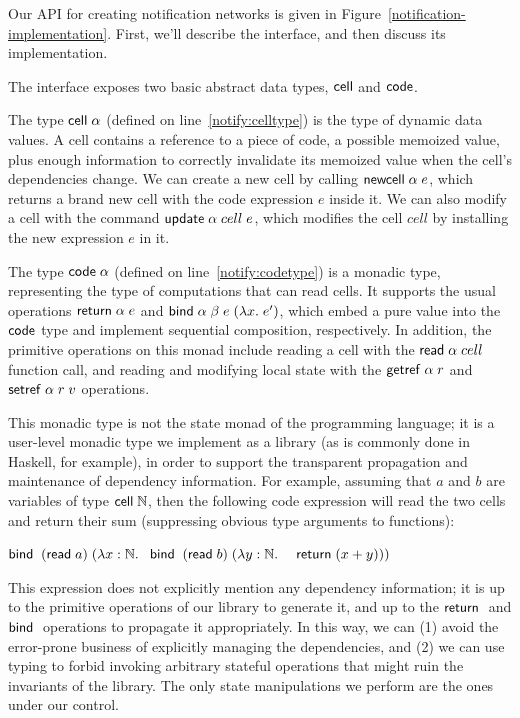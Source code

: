 \documentclass[preprint,natbib]{sigplanconf}
\begin{document}
Our API for creating notification networks is given in
Figure~\ref{notification-implementation}. First, we'll describe
the interface, and then discuss its implementation. 

The interface exposes two basic abstract data types, $\mbox{\textsf{{cell}}}$
and $\mbox{\textsf{{code}}}$.

The type $\mbox{\textsf{{cell}}}\;{\alpha}$ (defined on line~\ref{notify:celltype}) is the
type of dynamic data values. A cell contains a reference to a piece of
code, a possible memoized value, plus enough information to correctly
invalidate its memoized value when the cell's dependencies change. We
can create a new cell by calling $\mbox{\textsf{{newcell}}}\; \alpha\; e$, which returns a brand
new cell with the code expression $e$ inside it. We can also modify a
cell with the command $\mbox{\textsf{{update}}}\; \alpha\;cell\;e$, which modifies the
cell $cell$ by installing the new expression $e$ in it.

The type $\mbox{\textsf{{code}}}\;{\alpha}$ (defined on line~\ref{notify:codetype}) is a
monadic type, representing the type of computations that can read
cells. It supports the usual operations $\mbox{\textsf{{return}}}\; \alpha\;e$ and $\mbox{\textsf{{bind}}}\; \alpha\;\beta\;e\;
(\lambda x.\;e')$, which embed a pure value into the $\mbox{\textsf{{code}}}$
type and implement sequential composition, respectively. In addition,
the primitive operations on this monad include reading a cell with the
$\mbox{\textsf{{read}}}\; \alpha\;cell$ function call, and reading and modifying local state
with the $\mbox{\textsf{{getref}}}\; \alpha\;r$ and $\mbox{\textsf{{setref}}}\; \alpha\;r\;v$ operations.

This monadic type is not the state monad of the programming language;
it is a user-level monadic type we implement as a library (as is
commonly done in Haskell, for example), in order to support the
transparent propagation and maintenance of dependency information.
For example, assuming that $a$ and $b$ are variables of type
$\mbox{\textsf{{cell}}}\;{\mathbb{N}}$, then the following code expression will read the two
cells and return their sum (suppressing obvious type arguments to
functions):
\begin{specification}
\nextline  $\mbox{\textsf{{bind}}}\; \;(\mbox{\textsf{{read}}}\; a) \;(\lambda x:\mathbb{N}.\;$ 
\nextline  $\mbox{\textsf{{bind}}}\; \;(\mbox{\textsf{{read}}}\; b) \;(\lambda y:\mathbb{N}.\;$ 
\nextline  $\;\;\mbox{\textsf{{return}}}\;(x+y)))$ 
\end{specification}
This expression does not explicitly mention any dependency
information; it is up to the primitive operations of our library to
generate it, and up to the $\mbox{\textsf{{return}}}\;$ and $\mbox{\textsf{{bind}}}\;$ operations to propagate it
appropriately. In this way, we can (1) avoid the error-prone business
of explicitly managing the dependencies, and (2) we can use typing to
forbid invoking arbitrary stateful operations that might ruin  the
invariants of the library. The only state manipulations we perform are 
the ones under our control. 
 
\end{document}
